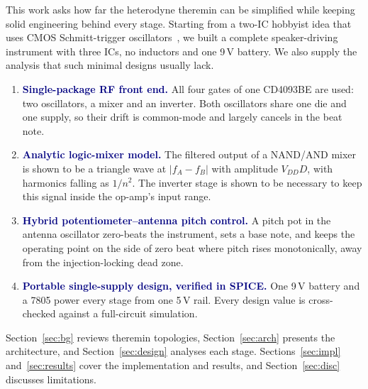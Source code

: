 \documentclass[conference]{IEEEtran}
\newcommand{\novel}[1]{\textcolor{navy}{\textbf{#1}}}
\begin{document}
This work asks how far the heterodyne theremin can be simplified while keeping solid engineering behind every stage. Starting from a two-IC hobbyist idea that uses CMOS Schmitt-trigger oscillators~\cite{greatscott}, we built a complete speaker-driving instrument with three ICs, no inductors and one 9\,V battery. We also supply the analysis that such minimal designs usually lack.

\begin{contrib}
\small
\begin{enumerate}\setlength{\itemsep}{1pt}
\item \novel{Single-package RF front end.} All four gates of one CD4093BE are used: two oscillators, a mixer and an inverter. Both oscillators share one die and one supply, so their drift is common-mode and largely cancels in the beat note.
\item \novel{Analytic logic-mixer model.} The filtered output of a NAND/AND mixer is shown to be a triangle wave at $|f_A-f_B|$ with amplitude $V_{DD}D$, with harmonics falling as $1/n^2$. The inverter stage is shown to be necessary to keep this signal inside the op-amp's input range.
\item \novel{Hybrid potentiometer--antenna pitch control.} A pitch pot in the antenna oscillator zero-beats the instrument, sets a base note, and keeps the operating point on the side of zero beat where pitch rises monotonically, away from the injection-locking dead zone.
\item \novel{Portable single-supply design, verified in SPICE.} One 9\,V battery and a 7805 power every stage from one 5\,V rail. Every design value is cross-checked against a full-circuit simulation.
\end{enumerate}
\end{contrib}

Section~\ref{sec:bg} reviews theremin topologies, Section~\ref{sec:arch} presents the architecture, and Section~\ref{sec:design} analyses each stage. Sections~\ref{sec:impl} and~\ref{sec:results} cover the implementation and results, and Section~\ref{sec:disc} discusses limitations.

\end{document}
